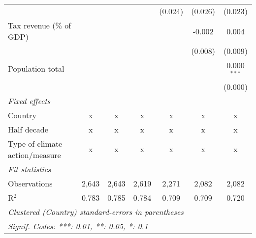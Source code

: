 \begin{tabular}{lcccccc}
                                                          &             &              &              & (0.024)       & (0.026)       & (0.023)\\   
   Tax revenue (\% of GDP)                                &             &              &              &               & -0.002        & 0.004\\   
                                                          &             &              &              &               & (0.008)       & (0.009)\\   
   Population total                                       &             &              &              &               &               & 0.000$^{***}$\\   
                                                          &             &              &              &               &               & (0.000)\\   
   \emph{Fixed effects}\\
   Country                                                & x           & x            & x            & x             & x             & x\\  
   Half decade                                            & x           & x            & x            & x             & x             & x\\  
   Type of climate action/measure                         & x           & x            & x            & x             & x             & x\\  
   \midrule \emph{Fit statistics}\\
   Observations                                           & 2,643       & 2,643        & 2,619        & 2,271         & 2,082         & 2,082\\  
   R$^2$                                                  & 0.783       & 0.785        & 0.784        & 0.709         & 0.709         & 0.720\\  
   \midrule
   \multicolumn{7}{l}{\emph{Clustered (Country) standard-errors in parentheses}}\\
   \multicolumn{7}{l}{\emph{Signif. Codes: ***: 0.01, **: 0.05, *: 0.1}}\\
\end{tabular}
\par\endgroup


